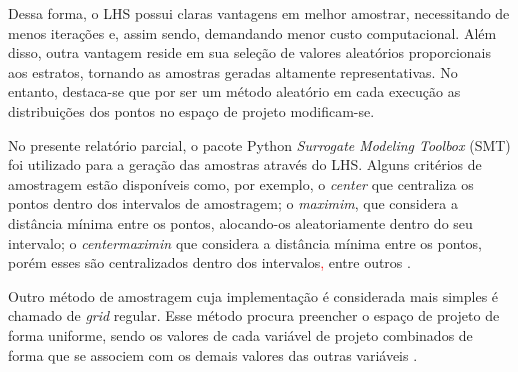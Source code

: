 Dessa forma, o LHS possui claras vantagens em melhor amostrar, necessitando de menos iterações e, assim sendo, demandando menor custo computacional. Além disso, outra vantagem reside em sua seleção de valores aleatórios proporcionais aos estratos, tornando as amostras geradas altamente representativas. No entanto, destaca-se que por ser um método aleatório em cada execução as distribuições dos pontos no espaço de projeto modificam-se. 

No presente relatório parcial, o pacote Python {\it Surrogate Modeling Toolbox} (SMT) foi utilizado para a geração das amostras através do LHS. Alguns critérios de amostragem estão disponíveis como, por exemplo, o {\it center} que centraliza os pontos dentro dos intervalos de amostragem; o {\it maximim}, que considera a distância mínima entre os pontos, alocando-os aleatoriamente dentro do seu intervalo; o {\it centermaximin} que considera a distância mínima entre os pontos, porém esses são centralizados dentro dos intervalos\textcolor{red}{,} entre outros \cite{BOUHLEL2019}. 

Outro método de amostragem cuja implementação é considerada mais simples é chamado de {\it grid} regular. Esse método procura preencher o espaço de projeto de forma uniforme, sendo os valores de cada variável de projeto combinados de forma que se associem com os demais valores das outras variáveis \cite{SICCHIERI2019}.

